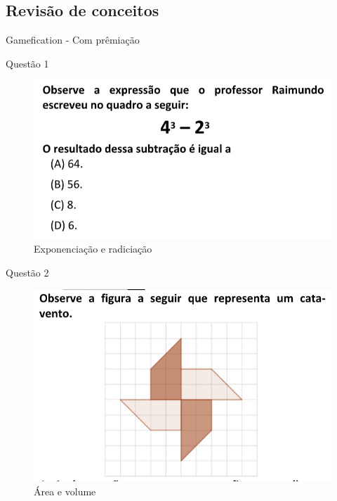 \documentclass{beamer}
\begin{document}
\subsection{Revisão de conceitos}
\begin{frame}{Gamefication - Com prêmiação}

\end{frame}
\begin{frame}{Questão 1}
    \begin{figure}
        \caption{Exponenciação e radiciação}
        \includegraphics[scale=0.8]{qst18.59.png}
    \end{figure}
\end{frame}
\begin{frame}{Questão 2}
    \begin{figure}
        \caption{Área e volume}
        \includegraphics[scale=0.6]{qst19.24.png}
    \end{figure}
\end{frame}
\end{document}
